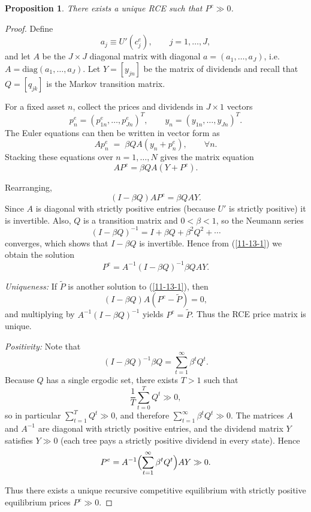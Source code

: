 \documentclass{tufte-handout}
\newtheorem{prop}[thm]{Proposition}
\theoremstyle{definition}
\begin{document}
\begin{prop}
	There exists a unique RCE such that $P^e \gg 0$.
\end{prop}
\begin{proof}
	Define
	\[
		a_j \equiv U'(c_j^e), \qquad j=1,\ldots,J,
	\]
	and let $A$ be the $J\times J$ diagonal matrix with diagonal
	$a = (a_1,\ldots,a_J)$, i.e.\ $A = \mathrm{diag}(a_1,\ldots,a_J)$.
	Let $Y = [y_{jn}]$ be the matrix of dividends and recall that
	$Q = [q_{jk}]$ is the Markov transition matrix.

	For a fixed asset $n$, collect the prices and dividends in
	$J\times 1$ vectors
	\[
		p_n^e = (p_{1n}^e,\ldots,p_{Jn}^e)^T, \qquad
		y_n = (y_{1n},\ldots,y_{Jn})^T .
	\]
	The Euler equations can then be written in vector form as
	\[
		A p_n^e \;=\; \beta Q A (y_n + p_n^e), \qquad \forall n.
	\]
	Stacking these equations over $n=1,\ldots,N$ gives the matrix equation
	\begin{equation}
		A P^e = \beta Q A (Y + P^e). \label{11-13-1}
	\end{equation}

	Rearranging,
	\[
		(I - \beta Q) A P^e = \beta Q A Y.
	\]
	Since $A$ is diagonal with strictly positive entries (because $U'$ is
	strictly positive) it is invertible.  Also, $Q$ is a transition matrix and
	$0<\beta<1$, so the Neumann series
	\[
		(I - \beta Q)^{-1} = I + \beta Q + \beta^2 Q^2 + \cdots
	\]
	converges, which shows that $I - \beta Q$ is invertible.  Hence from
	(\ref{11-13-1}) we obtain the solution
	\[
		P^e
		= A^{-1} (I - \beta Q)^{-1} \beta Q A Y.
	\]

	\emph{Uniqueness:} If $\widetilde P$ is another solution to (\ref{11-13-1}), then
	\[
		(I - \beta Q) A (P^e - \widetilde P) = 0,
	\]
	and multiplying by $A^{-1}(I - \beta Q)^{-1}$ yields $P^e = \widetilde P$.
	Thus the RCE price matrix is unique.

	\emph{Positivity:} Note that
	\[
		(I - \beta Q)^{-1} \beta Q
		= \sum_{t=1}^{\infty} \beta^t Q^t.
	\]
	Because $Q$ has a single ergodic set, there exists $T>1$ such that
	\[
		\frac{1}{T} \sum_{t=0}^T Q^t \gg 0,
	\]
	so in particular $\sum_{t=1}^T Q^t \gg 0$, and therefore
	$\sum_{t=1}^{\infty} \beta^t Q^t \gg 0$.  The matrices $A$ and $A^{-1}$
	are diagonal with strictly positive entries, and the dividend matrix
	$Y$ satisfies $Y \gg 0$ (each tree pays a strictly positive dividend in
	every state).  Hence
	\[
		P^e
		= A^{-1} \Bigl( \sum_{t=1}^{\infty} \beta^t Q^t \Bigr) A Y \gg 0.
	\]

	Thus there exists a unique recursive competitive equilibrium with
	strictly positive equilibrium prices $P^e \gg 0$.
\end{proof}
\end{document}

